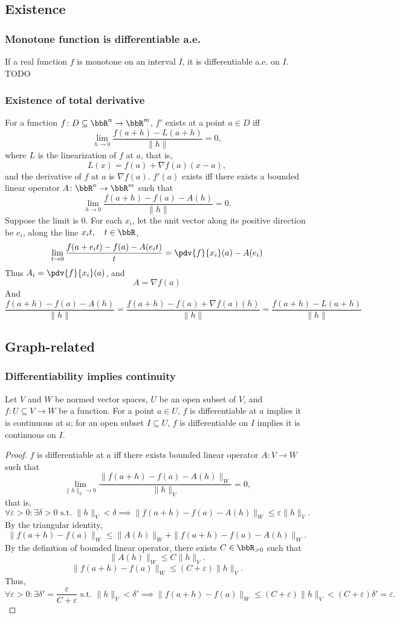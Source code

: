 \documentclass[a4paper,12pt]{report}
\begin{document}
\begin{itemize}
\begin{itemize}
\subsection{Existence}
\subsubsection{Monotone function is differentiable a.e.}
If a real function $f$ is monotone on an interval $I$, it is differentiable a.e. on $I$.
\bpr
TODO
\epr
\subsubsection{Existence of total derivative}
For a function $f\colon D\subseteq\bbR^n\to\bbR^m$, $f'$ exists at a point $a\in D$ iff
\[\lim_{h\to 0}\frac{f(a+h)-L(a+h)}{\|h\|}=0,\]
where $L$ is the linearization of $f$ at $a$, that is,
\[L(x)=f(a)+\nabla f(a)(x-a),\]
and the derivative of $f$ at $a$ is $\nabla f(a)$.
\bpr
$f'(a)$ exists iff there exists a bounded linear operator $A\colon\bbR^n\to\bbR^m$ such that
\[\lim_{h\to0}\frac{f(a+h)-f(a)-A(h)}{\|h\|}=0.\]
Suppose the limit is 0. For each $x_i$, let the unit vector along its positive direction be $e_i$, along the line $x_it,\quad t\in\bbR$,
\[\lim_{t\to0}\frac{f(a+e_it)-f(a)-A(e_it)}{t}=\pdv{f}{x_i}(a)-A(e_i)\]
Thus $A_i=\pdv{f}{x_i}(a)$, and
\[A=\nabla f(a)\]
And
\[\frac{f(a+h)-f(a)-A(h)}{\|h\|}=\frac{f(a+h)-f(a)+\nabla f(a)(h)}{\|h\|}=\frac{f(a+h)-L(a+h)}{\|h\|}\]
\epr
\subsection{Graph-related}
\subsubsection{Differentiability implies continuity}
Let $V$ and $W$ be normed vector spaces, $U$ be an open subset of $V$, and $f\colon U\subseteq V\to W$ be a function. For a point $a\in U$, $f$ is differentiable at $a$ implies it is continuous at $a$; for an open subset $I\subseteq U$, $f$ is differentiable on $I$ implies it is continuous on $I$.
\begin{proof}
$f$ is differentiable at $a$ iff there exists bounded linear operator $A\colon V\to W$ such that
\[\lim_{\|h\|_V\to 0}\frac{\|f(a+h)-f(a)-A(h)\|_W}{\|h\|_V}=0,\]
that is,
\[\forall\varepsilon>0\colon\exists\delta>0\text{\ s.t.\ }\|h\|_V<\delta\implies\|f(a+h)-f(a)-A(h)\|_W\leq\varepsilon\|h\|_V.\]
By the triangular identity,
\[\|f(a+h)-f(a)\|_W\leq\|A(h)\|_W+\|f(a+h)-f(a)-A(h)\|_W.\]
By the definition of bounded linear operator, there exists $C\in\bbR_{>0}$ such that
\[\|A(h)\|_W\leq C\|h\|_V.\]
\[\|f(a+h)-f(a)\|_W\leq (C+\varepsilon)\|h\|_V.\]
Thus,
\[\forall\varepsilon>0\colon\exists\delta'=\frac{\varepsilon}{C+\varepsilon}\text{\ s.t.\ }\|h\|_V<\delta'\implies\|f(a+h)-f(a)\|_W\leq(C+\varepsilon)\|h\|_V<(C+\varepsilon)\delta'=\varepsilon.\]
\end{proof}

\end{itemize}
\end{itemize}
\end{document}
